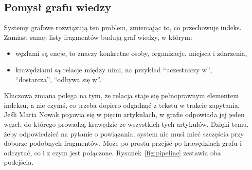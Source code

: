 \documentclass[11pt,a4paper]{article}
\begin{document}
\subsection{Pomysł grafu wiedzy}

Systemy grafowe rozwiązują ten problem, zmieniając to, co przechowuje indeks. Zamiast samej
listy fragmentów budują graf wiedzy, w którym:

\begin{itemize}[itemsep=2pt]
  \item węzłami są encje, to znaczy konkretne osoby, organizacje, miejsca i zdarzenia,
  \item krawędziami są relacje między nimi, na przykład \enquote{uczestniczy w},
        \enquote{dostarcza}, \enquote{odbywa się w}.
\end{itemize}

Kluczowa zmiana polega na tym, że relacja staje się pełnoprawnym elementem indeksu, a nie
czymś, co trzeba dopiero odgadnąć z tekstu w trakcie zapytania. Jeśli Maria Nowak pojawia
się w pięciu artykułach, w grafie odpowiada jej jeden węzeł, do którego prowadzą krawędzie ze
wszystkich tych artykułów. Dzięki temu, żeby odpowiedzieć na pytanie o powiązania, system nie
musi mieć szczęścia przy doborze podobnych fragmentów. Może po prostu przejść po krawędziach
grafu i odczytać, co i z czym jest połączone. Rysunek~\ref{fig:pipeline} zestawia oba
podejścia.
\end{document}

